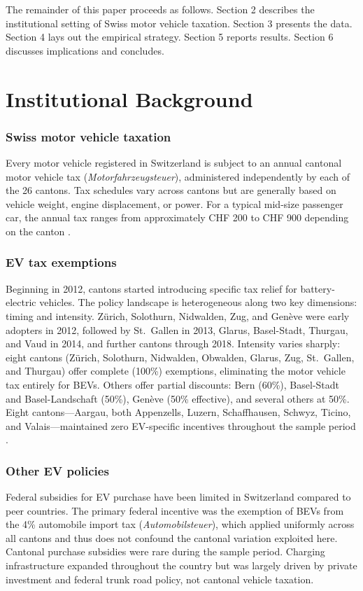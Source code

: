 \documentclass[12pt]{article}
\begin{document}
The remainder of this paper proceeds as follows. Section 2 describes the institutional setting of Swiss motor vehicle taxation. Section 3 presents the data. Section 4 lays out the empirical strategy. Section 5 reports results. Section 6 discusses implications and concludes.

\section{Institutional Background}

\subsubsection*{Swiss motor vehicle taxation} Every motor vehicle registered in Switzerland is subject to an annual cantonal motor vehicle tax (\textit{Motorfahrzeugsteuer}), administered independently by each of the 26 cantons. Tax schedules vary across cantons but are generally based on vehicle weight, engine displacement, or power. For a typical mid-size passenger car, the annual tax ranges from approximately CHF 200 to CHF 900 depending on the canton \citep{tcs2023automobilsteuer}.

\subsubsection*{EV tax exemptions} Beginning in 2012, cantons started introducing specific tax relief for battery-electric vehicles. The policy landscape is heterogeneous along two key dimensions: timing and intensity. Zürich, Solothurn, Nidwalden, Zug, and Genève were early adopters in 2012, followed by St.~Gallen in 2013, Glarus, Basel-Stadt, Thurgau, and Vaud in 2014, and further cantons through 2018. Intensity varies sharply: eight cantons (Zürich, Solothurn, Nidwalden, Obwalden, Glarus, Zug, St.~Gallen, and Thurgau) offer complete (100\%) exemptions, eliminating the motor vehicle tax entirely for BEVs. Others offer partial discounts: Bern (60\%), Basel-Stadt and Basel-Landschaft (50\%), Genève (50\% effective), and several others at 50\%. Eight cantons---Aargau, both Appenzells, Luzern, Schaffhausen, Schwyz, Ticino, and Valais---maintained zero EV-specific incentives throughout the sample period \citep{bfe2023steuererleichterungen}.

\subsubsection*{Other EV policies} Federal subsidies for EV purchase have been limited in Switzerland compared to peer countries. The primary federal incentive was the exemption of BEVs from the 4\% automobile import tax (\textit{Automobilsteuer}), which applied uniformly across all cantons and thus does not confound the cantonal variation exploited here. Cantonal purchase subsidies were rare during the sample period. Charging infrastructure expanded throughout the country but was largely driven by private investment and federal trunk road policy, not cantonal vehicle taxation.
\end{document}
